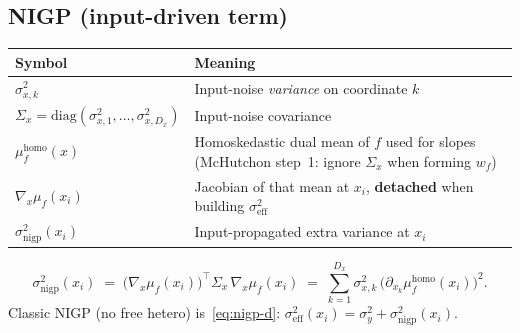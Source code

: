 \documentclass[11pt]{article}
\newcommand{\sigy}{\sigma_{y}^{2}}%
\newcommand{\signigp}{\sigma_{\mathrm{nigp}}^{2}}%
\newcommand{\sigeff}{\sigma_{\mathrm{eff}}^{2}}%
\newcommand{\Sigx}{\Sigma_{x}}%
\newcommand{\gradmuf}{\nabla_{x}\mu_{f}}%
\begin{document}
\subsection{NIGP (input-driven term)}
\begin{center}
\small
\begin{tabularx}{\textwidth}{@{}>{\raggedright\arraybackslash}p{}
  >{\raggedright\arraybackslash}X@{}}
\toprule
\textbf{Symbol} & \textbf{Meaning} \\
\midrule
$\sigma_{x,k}^{2}$ & Input-noise \emph{variance} on coordinate $k$ \\
$\Sigx=\mathrm{diag}(\sigma_{x,1}^{2},\ldots,\sigma_{x,D_x}^{2})$
  & Input-noise covariance \\
$\mu_f^{\mathrm{homo}}(x)$ & Homoskedastic dual mean of $f$ used for slopes
  (McHutchon step~1: ignore $\Sigx$ when forming $w_f$) \\
$\gradmuf(x_i)$ & Jacobian of that mean at $x_i$, \textbf{detached} when building $\sigeff$ \\
$\signigp(x_i)$ & Input-propagated extra variance at $x_i$ \\
\bottomrule
\end{tabularx}
\end{center}
\[
  \signigp(x_i)
  \;=\;
  \bigl(\gradmuf(x_i)\bigr)^{\!\top}
  \Sigx\,
  \gradmuf(x_i)
  \;=\;
  \sum_{k=1}^{D_x}
  \sigma_{x,k}^{2}\,
  \bigl(\partial_{x_k}\mu_f^{\mathrm{homo}}(x_i)\bigr)^{2}.
\]
Classic NIGP (no free hetero) is~\eqref{eq:nigp-d}:
$\sigeff(x_i)=\sigy+\signigp(x_i)$.
\end{document}
